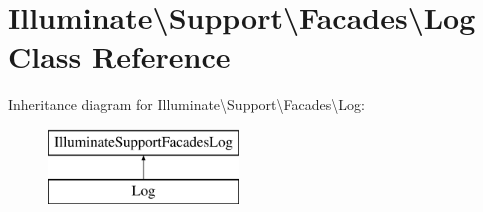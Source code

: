 \hypertarget{class_illuminate_1_1_support_1_1_facades_1_1_log}{}\section{Illuminate\textbackslash{}Support\textbackslash{}Facades\textbackslash{}Log Class Reference}
\label{class_illuminate_1_1_support_1_1_facades_1_1_log}
Inheritance diagram for Illuminate\textbackslash{}Support\textbackslash{}Facades\textbackslash{}Log\+:\begin{figure}[H]
\begin{center}
\leavevmode
\includegraphics[height=2.000000cm]{class_illuminate_1_1_support_1_1_facades_1_1_log}
\end{center}
\end{figure}
